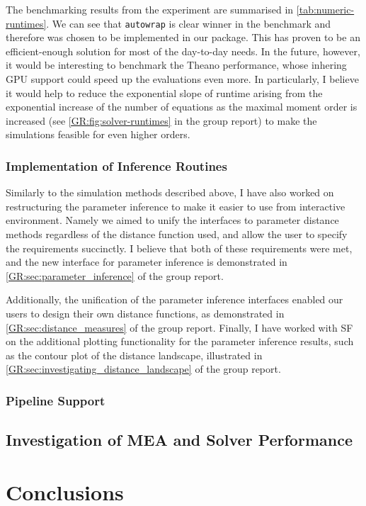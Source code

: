 The benchmarking results from the experiment are summarised in \autoref{tab:numeric-runtimes}. 
We can see that \verb"autowrap" is clear winner in the benchmark and therefore was chosen to be implemented in our package.
This has proven to be an efficient-enough solution for most of the day-to-day needs. 
In the future, however, it would be interesting to benchmark the Theano performance, whose inhering GPU support could speed up the evaluations even more.
In particularly, I believe it would help to reduce the exponential slope of runtime arising from the exponential increase of the number of equations as the maximal moment order is increased (see \autoref{GR:fig:solver-runtimes} in the group report) to make the simulations feasible for even higher orders. 

\subsubsection{Implementation of Inference Routines}

Similarly to the simulation methods described above, I have also worked on restructuring the parameter inference to make it easier to use from interactive environment. 
Namely we aimed to unify the interfaces to parameter distance methods regardless of the distance function used, and allow the user to specify the requirements succinctly.
I believe that both of these requirements were met, and the new interface for parameter inference is demonstrated in \autoref*{GR:sec:parameter_inference} of the group report.

Additionally, the unification of the parameter inference interfaces enabled our users to design their own distance functions, as demonstrated in \autoref*{GR:sec:distance_measures} of the group report.
Finally, I have worked with SF on the additional plotting functionality for the parameter inference results, such as the contour plot of the distance landscape, illustrated in 
\autoref*{GR:sec:investigating_distance_landscape} of the group report.

\subsubsection{Pipeline Support}

\subsection{Investigation of MEA and Solver Performance}

\section{Conclusions}

